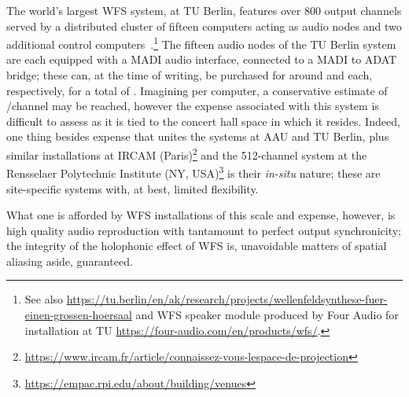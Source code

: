 The world's largest WFS system, at TU Berlin, features over 800 output channels
served by a distributed cluster of fifteen computers acting as audio nodes and
two additional control computers~\citep{baalman_renewed_2007}.\footnote{
    See also
    \url{https://tu.berlin/en/ak/research/projects/wellenfeldsynthese-fuer-einen-grossen-hoersaal}
    and WFS speaker module produced by Four Audio for installation at TU
    \url{https://four-audio.com/en/products/wfs/}.
}
The fifteen audio nodes of the TU Berlin system are each equipped with a MADI
audio interface, connected to a MADI to ADAT bridge;
these can, at the time of writing, be purchased for around 
and  each, respectively, for a total of
.
Imagining  per computer, a conservative estimate of
/channel may be reached, however the expense associated with this
system is difficult to assess as it is tied to the concert hall space in which
it resides.
Indeed, one thing besides expense that unites the systems at AAU and TU Berlin,
plus similar installations at IRCAM (Paris)\footnote{
    \url{https://www.ircam.fr/article/connaissez-vous-lespace-de-projection}
} and the 512-channel system at the Rensselaer Polytechnic Institute
(NY, USA)\footnote{
    \url{https://empac.rpi.edu/about/building/venues}
} is their \textit{in-situ} nature;
these are site-specific systems with, at best, limited flexibility.

What one is afforded by WFS installations of this scale and expense, however, is
high quality audio reproduction with tantamount to perfect output synchronicity;
the integrity of the holophonic effect of WFS is, unavoidable matters of spatial
aliasing aside, guaranteed.
